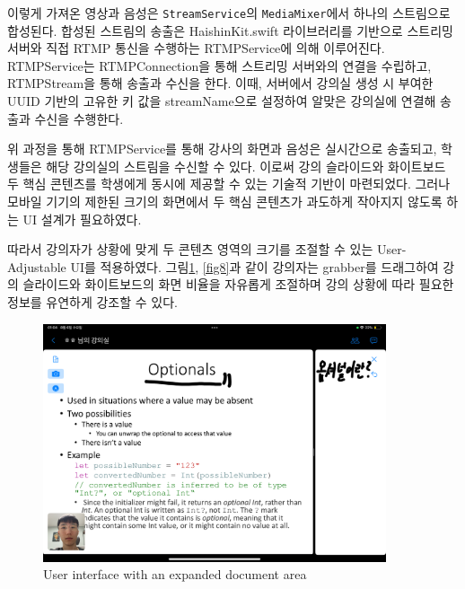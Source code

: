 \documentclass[pdflatex,sn-mathphys-num]{sn-jnl}%
\theoremstyle{thmstyleone}%
\theoremstyle{thmstyletwo}%
\theoremstyle{thmstylethree}%
\begin{document}
이렇게 가져온 영상과 음성은 \verb+StreamService+의 \verb+MediaMixer+에서 하나의 스트림으로 합성된다. 합성된 스트림의 송출은 HaishinKit.swift\cite{HaishinKit} 라이브러리를 기반으로 스트리밍 서버와 직접 RTMP 통신을 수행하는 RTMPService에 의해 이루어진다. RTMPService는 RTMPConnection을 통해 스트리밍 서버와의 연결을 수립하고, RTMPStream을 통해 송출과 수신을 한다. 이때, 서버에서 강의실 생성 시 부여한 UUID 기반의 고유한 키 값을 streamName으로 설정하여 알맞은 강의실에 연결해 송출과 수신을 수행한다.

위 과정을 통해 RTMPService를 통해 강사의 화면과 음성은 실시간으로 송출되고, 학생들은 해당 강의실의 스트림을 수신할 수 있다. 이로써 강의 슬라이드와 화이트보드 두 핵심 콘텐츠를 학생에게 동시에 제공할 수 있는 기술적 기반이 마련되었다. 그러나 모바일 기기의 제한된 크기의 화면에서 두 핵심 콘텐츠가 과도하게 작아지지 않도록 하는 UI 설계가 필요하였다.

따라서 강의자가 상황에 맞게 두 콘텐츠 영역의 크기를 조절할 수 있는 User-Adjustable UI를 적용하였다. 그림\ref{fig7}, \ref{fig8}과 같이 강의자는 grabber를 드래그하여 강의 슬라이드와 화이트보드의 화면 비율을 자유롭게 조절하며 강의 상황에 따라 필요한 정보를 유연하게 강조할 수 있다.

\begin{figure}[H]
\centering
\includegraphics[width=0.9\textwidth]{UserInterfaceWithAnExpandedDocumentArea.PNG}
\caption{User interface with an expanded document area}\label{fig7}
\end{figure}
\end{document}
